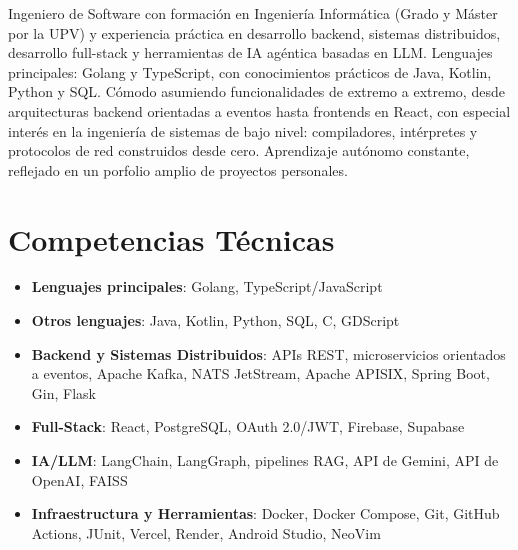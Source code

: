 \documentclass[11pt,a4paper,sans]{moderncv}
\begin{document}
\makecvtitle


\vspace{6pt}
\small{Ingeniero de Software con formación en Ingeniería Informática (Grado y Máster por la UPV) y experiencia práctica en desarrollo backend, sistemas distribuidos, desarrollo full-stack y herramientas de IA agéntica basadas en LLM. Lenguajes principales: Golang y TypeScript, con conocimientos prácticos de Java, Kotlin, Python y SQL. Cómodo asumiendo funcionalidades de extremo a extremo, desde arquitecturas backend orientadas a eventos hasta frontends en React, con especial interés en la ingeniería de sistemas de bajo nivel: compiladores, intérpretes y protocolos de red construidos desde cero. Aprendizaje autónomo constante, reflejado en un porfolio amplio de proyectos personales.}


\section{Competencias Técnicas}
\vspace{1pt}
\begin{itemize}

\item \textbf{Lenguajes principales}: Golang, TypeScript/JavaScript

\item \textbf{Otros lenguajes}: Java, Kotlin, Python, SQL, C, GDScript

\item \textbf{Backend y Sistemas Distribuidos}: APIs REST, microservicios orientados a eventos, Apache Kafka, NATS JetStream, Apache APISIX, Spring Boot, Gin, Flask

\item \textbf{Full-Stack}: React, PostgreSQL, OAuth 2.0/JWT, Firebase, Supabase

\item \textbf{IA/LLM}: LangChain, LangGraph, pipelines RAG, API de Gemini, API de OpenAI, FAISS

\item \textbf{Infraestructura y Herramientas}: Docker, Docker Compose, Git, GitHub Actions, JUnit, Vercel, Render, Android Studio, NeoVim

\end{itemize}
\end{document}
